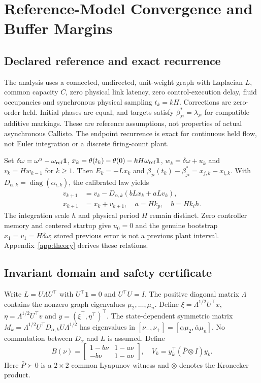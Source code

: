 \section{Reference-Model Convergence and Buffer Margins}
\label{sec:btd_reference}

\subsection{Declared reference and exact recurrence}
The analysis uses a connected, undirected, unit-weight graph with
Laplacian $L$, common capacity $C$, zero physical link latency, zero
control-execution delay, fluid
occupancies and synchronous physical sampling $t_k=kH$. Corrections
are zero-order held. Initial phases are equal, and targets satisfy
$\beta^*_{ji}=\lambda_{ji}$ for compatible additive markings. These
are reference assumptions, not properties of actual asynchronous
Callisto. The endpoint recurrence is exact for continuous held flow,
not Euler integration or a discrete firing-count plant.

Set $\delta\omega=\omega^u-\omega_{\rm ref}\mathbf1$,
$x_k=\theta(t_k)-\theta(0)-kH\omega_{\rm ref}\mathbf1$,
$w_k=\delta\omega+u_k$ and $v_k=Hw_{k-1}$ for $k\ge1$.
Then $E_k=-Lx_k$ and $\beta_{ji}(t_k)-\beta^*_{ji}=x_{j,k}-x_{i,k}$.
With $D_{\alpha,k}=\operatorname{diag}(\alpha_{i,k})$, the calibrated
law yields
\begin{align}
 v_{k+1}&=v_k-D_{\alpha,k}(bLx_k+aLv_k),\nonumber\\
 x_{k+1}&=x_k+v_{k+1},\quad a=Hk_p,\quad b=Hk_ih.
 \label{eq:btd_full_recurrence}
\end{align}
The integration scale $h$ and physical period $H$ remain distinct.
Zero controller memory and centered startup give $u_0=0$ and the
genuine bootstrap $x_1=v_1=H\delta\omega$; stored previous error is
not a previous plant interval. Appendix~\ref{app:theory} derives these relations.

\subsection{Invariant domain and safety certificate}
Write $L=U\Lambda U^\top$ with $U^\top\mathbf1=0$ and
$U^\top U=I$. The positive diagonal matrix $\Lambda$ contains
the nonzero graph eigenvalues $\mu_2,\ldots,\mu_n$.
Define $\xi=\Lambda^{1/2}U^\top x$, $\eta=\Lambda^{1/2}U^\top v$
and $y=(\xi^\top,\eta^\top)^\top$. The state-dependent symmetric
matrix $M_k=\Lambda^{1/2}U^\top D_{\alpha,k}U\Lambda^{1/2}$ has
eigenvalues in $[\nu_-,\nu_+]=[\underline\alpha\mu_2,
\overline\alpha\mu_n]$. No commutation between $D_\alpha$ and $L$
is assumed. Define
\begin{equation}
 B(\nu)=\begin{bmatrix}1-b\nu&1-a\nu\\-b\nu&1-a\nu\end{bmatrix},
 \quad V_k=y_k^\top(\bar P\otimes I)y_k.
\end{equation}
Here $\bar P\succ0$ is a $2\times2$ common Lyapunov witness and
$\otimes$ denotes the Kronecker product.

